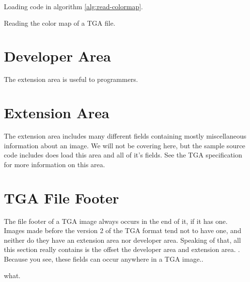 \begin{refsection}
  Loading code in algorithm \ref{alg:read-colormap}.

  \begin{algorithm}[H]
    \caption{Reading the color map of a TGA file.}
    \label{alg:read-colormap}
    \begin{algorithmic}[1]
      \EndFor
    \end{algorithmic}
  \end{algorithm}


  \section{Developer Area}

  The extension area is useful to programmers.

  \section{Extension Area}

  The extension area includes many different fields containing mostly
  miscellaneous information about an image. We will not be covering
  here, but the sample source code includes does load this area and
  all of it's fields. See the TGA specification for more information
  on this area.

  \section{TGA File Footer}

  The file footer of a TGA image always occurs in the end of it, if it
  has one. Images made before the version 2 of the TGA format tend not
  to have one, and neither do they have an extension area nor
  developer area. Speaking of that, all this section really contains
  is the offset the developer area and extension area. . Because you see, these fields can occur
  anywhere in a TGA image..

  what.

  \printbibliography[heading=subbibliography]

\end{refsection}